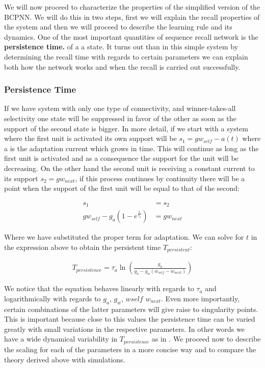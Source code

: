 \documentclass[10pt,a4paper]{article}
\begin{document}
We will now proceed to characterize the properties of the simplified version of the BCPNN. We will do this in two steps, first we will explain the recall properties of the system and then we will proceed to describe the learning rule and its dynamics. One of the most important quantities of sequence recall network is the \textbf{persistence time.} of a a state. It turns out than in this simple system by determining the recall time with regards to certain parameters we can explain both how the network works and when the recall is carried out successfully.


\subsubsection{Persistence Time}
If we have system with only one type of connectivity, and winner-takes-all selectivity one state will be suppressed in favor of the other as soon as the support of the second state is bigger. In more detail, if we start with a system where the first unit is activated its own support will be $s_1 = g w_{self} - a(t)$ where a is the adaptation current which grows in time. This will continue as long as the first unit is activated and as a consequence the support for the unit will be decreasing. On the other hand the second unit is receiving a constant current to its support $s_2 = g w_{next}$, if this process continues by continuity there will be a point when the support of the first unit will be equal to that of the second:

\begin{align*}
s_1 &= s_2 \\
gw_{self} - g_{a} (1 - e^{\frac{t}{\tau_a}}) &=  g w_{next}
\end{align*}


Where we have substituted the proper term for adaptation. We can solve for $t$ in the expression above to obtain the persistent time $T_{persistent}$:

\begin{align}
T_{persistence} = \tau_{a} \ln \left(\frac{g_a}{g_a - g_w (w_{self}  - w_{next})} \right) \label{eq:simple_bcpnn_persistence_time}
\end{align}

We notice that the equation behaves linearly with regards to $\tau_a$ and logarithmically with regards to $g_a$, $g_w$, $w{self}$ $w_{next}$. Even more importantly, certain combinations of the latter parameters will give raise to singularity points. This is important because close to this values the persistence time can be varied greatly with small variations in the respective parameters. In other words we have a wide dynamical variability in $T_{persistence}$ as in \cite{murray2017learning}. We proceed now to describe the scaling for each of the parameters in a more concise way and to compare the theory derived above with simulations. 
\end{document}
